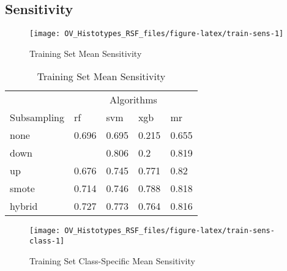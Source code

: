 \documentclass[
]{report}
\begin{document}
\subsection{Sensitivity}\label{sensitivity-1}

\begin{figure}[H]

{\centering \texttt{[image: OV\_Histotypes\_RSF\_files/figure-latex/train-sens-1]} 

}

\caption{Training Set Mean Sensitivity}\label{fig:train-sens}
\end{figure}

\begin{table}

\caption{\label{tab:train-sens-table}Training Set Mean Sensitivity}
\centering
\begin{tabular}[t]{l|l|l|l|l}
\hline
\multicolumn{1}{c|}{ } & \multicolumn{4}{c}{Algorithms} \\
\cline{2-5}
Subsampling & rf & svm & xgb & mr\\
\hline
none & 0.696 & 0.695 & 0.215 & 0.655\\
\hline
down & \cellcolor[HTML]{90ee90}{0.826} & 0.806 & 0.2 & 0.819\\
\hline
up & 0.676 & 0.745 & 0.771 & 0.82\\
\hline
smote & 0.714 & 0.746 & 0.788 & 0.818\\
\hline
hybrid & 0.727 & 0.773 & 0.764 & 0.816\\
\hline
\end{tabular}
\end{table}

\begin{figure}[H]

{\centering \texttt{[image: OV\_Histotypes\_RSF\_files/figure-latex/train-sens-class-1]} 

}

\caption{Training Set Class-Specific Mean Sensitivity}\label{fig:train-sens-class}
\end{figure}
\end{document}
